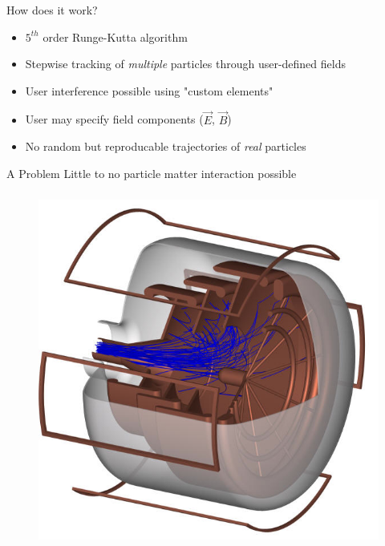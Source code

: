 \documentclass{beamer}
\newcommand{\ident}{\thesection.\thesubsection}
\newcommand{\ftitle}{\frametitle{\nameref{\ident}}}
\begin{document}
\begin{frame}
	\ftitle
	\begin{block}{How does it work?}
		\begin{itemize}
			\item $5^{th}$ order Runge-Kutta algorithm
			\item Stepwise tracking of \emph{multiple} particles through user-defined fields
			\item User interference possible using "custom elements"
			\item User may specify field components ($\vec{E}$, $\vec{B}$)
			\item No random but reproducable trajectories of \emph{real} particles
		\end{itemize}
	\end{block}
	\pause
	\begin{alertblock}{A Problem}
		Little to no particle matter interaction possible
	\end{alertblock}

\end{frame}

\begin{frame}
	\ftitle
	\begin{figure}
		\includegraphics[height=0.7\textheight]{img/collector}
	\end{figure}
\end{frame}
\end{document}
